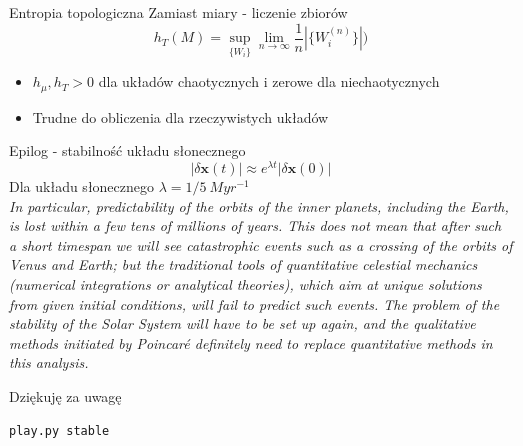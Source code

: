 \documentclass{beamer}
\begin{document}
\begin{frame}{Entropia topologiczna}
	Zamiast miary - liczenie zbiorów
	\begin{equation*}
		h_T(M) = \sup_{\{W_i\}}\lim_{n\to\infty}\frac{1}{n}|\{W_i^{(n)}\}|)
	\end{equation*}
	\begin{itemize}
		\item $h_\mu, h_T > 0 $ dla układów chaotycznych i zerowe dla niechaotycznych
		\item Trudne do obliczenia dla rzeczywistych układów
	\end{itemize} 
\end{frame}

\begin{frame}{Epilog - stabilność układu słonecznego}
	\begin{equation*}
	| \delta\mathbf{x}(t) | \approx e^{\lambda t} | \delta \mathbf{x}(0) |
	\end{equation*}
	\pause
	Dla układu słonecznego $\lambda = 1/5\ Myr^{-1}$ \cite{laskar1989numerical}\pause\\
	\textit{In particular, predictability of the orbits of the inner planets, including
	the Earth, is lost within a few tens of millions of years. This does not mean
	that after such a short timespan we will see catastrophic events such as a
	crossing of the orbits of Venus and Earth; but the traditional tools of
	quantitative celestial mechanics (numerical integrations or analytical
	theories), which aim at unique solutions from given initial conditions, will
	fail to predict such events. The problem of the stability of the Solar System
	will have to be set up again, and the qualitative methods initiated by Poincaré
	definitely need to replace quantitative methods in this analysis.}
\end{frame}

\begin{frame}
\nocite{ht_scholarpedia}
\nocite{stewart1994czy}
\nocite{ott2002chaos}
\nocite{ChaosBook}
{}

\end{frame}

\begin{frame}[fragile]
Dziękuję za uwagę
\begin{lstlisting}
play.py stable
\end{lstlisting}
\end{frame}
\end{document}
